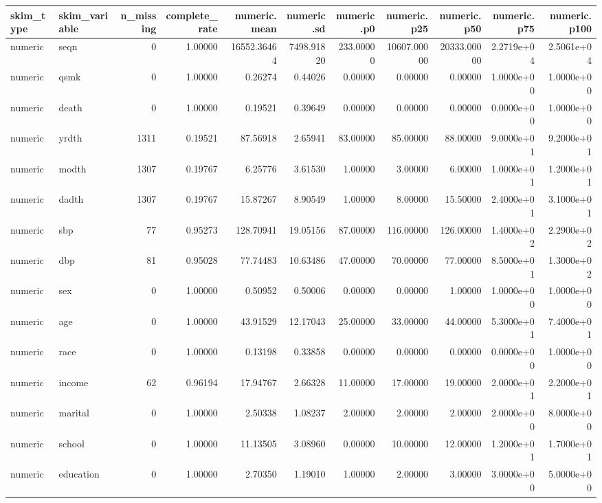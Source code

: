 \documentclass[12pt, krantz2,]{book}
\theoremstyle{definition}
\theoremstyle{definition}
\theoremstyle{definition}
\newcommand{\1}{\mathbbm{1}}
\begin{document}
\begin{tabular}{l|l|r|r|r|r|r|r|r|r|r}
\hline
skim\_type & skim\_variable & n\_missing & complete\_rate & numeric.mean & numeric.sd & numeric.p0 & numeric.p25 & numeric.p50 & numeric.p75 & numeric.p100\\
\hline
numeric & seqn & 0 & 1.00000 & 16552.36464 & 7498.91820 & 233.00000 & 10607.00000 & 20333.00000 & 2.2719e+04 & 2.5061e+04\\
\hline
numeric & qsmk & 0 & 1.00000 & 0.26274 & 0.44026 & 0.00000 & 0.00000 & 0.00000 & 1.0000e+00 & 1.0000e+00\\
\hline
numeric & death & 0 & 1.00000 & 0.19521 & 0.39649 & 0.00000 & 0.00000 & 0.00000 & 0.0000e+00 & 1.0000e+00\\
\hline
numeric & yrdth & 1311 & 0.19521 & 87.56918 & 2.65941 & 83.00000 & 85.00000 & 88.00000 & 9.0000e+01 & 9.2000e+01\\
\hline
numeric & modth & 1307 & 0.19767 & 6.25776 & 3.61530 & 1.00000 & 3.00000 & 6.00000 & 1.0000e+01 & 1.2000e+01\\
\hline
numeric & dadth & 1307 & 0.19767 & 15.87267 & 8.90549 & 1.00000 & 8.00000 & 15.50000 & 2.4000e+01 & 3.1000e+01\\
\hline
numeric & sbp & 77 & 0.95273 & 128.70941 & 19.05156 & 87.00000 & 116.00000 & 126.00000 & 1.4000e+02 & 2.2900e+02\\
\hline
numeric & dbp & 81 & 0.95028 & 77.74483 & 10.63486 & 47.00000 & 70.00000 & 77.00000 & 8.5000e+01 & 1.3000e+02\\
\hline
numeric & sex & 0 & 1.00000 & 0.50952 & 0.50006 & 0.00000 & 0.00000 & 1.00000 & 1.0000e+00 & 1.0000e+00\\
\hline
numeric & age & 0 & 1.00000 & 43.91529 & 12.17043 & 25.00000 & 33.00000 & 44.00000 & 5.3000e+01 & 7.4000e+01\\
\hline
numeric & race & 0 & 1.00000 & 0.13198 & 0.33858 & 0.00000 & 0.00000 & 0.00000 & 0.0000e+00 & 1.0000e+00\\
\hline
numeric & income & 62 & 0.96194 & 17.94767 & 2.66328 & 11.00000 & 17.00000 & 19.00000 & 2.0000e+01 & 2.2000e+01\\
\hline
numeric & marital & 0 & 1.00000 & 2.50338 & 1.08237 & 2.00000 & 2.00000 & 2.00000 & 2.0000e+00 & 8.0000e+00\\
\hline
numeric & school & 0 & 1.00000 & 11.13505 & 3.08960 & 0.00000 & 10.00000 & 12.00000 & 1.2000e+01 & 1.7000e+01\\
\hline
numeric & education & 0 & 1.00000 & 2.70350 & 1.19010 & 1.00000 & 2.00000 & 3.00000 & 3.0000e+00 & 5.0000e+00\\

\end{tabular}
\end{document}
